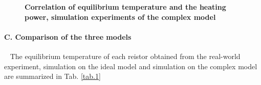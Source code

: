 \documentclass[10pt,a4paper,twocolumn,twoside,UTF8]{article}
\begin{document}
	\begin{figure}[htbp]
		\centering

		\caption{\textbf{Correlation of equilibrium temperature and the heating power, simulation experiments of the complex model}}
		\label{fig.1.3.2}
	\end{figure}


	\paragraph{C. Comparison of the three models}~
	\newline 
	\indent
	The equilibrium temperature of each reistor obtained from the real-world experiment, simulation on the ideal model and simulation on the complex model are summarized in Tab. \ref{tab.1}
	
\end{document}
